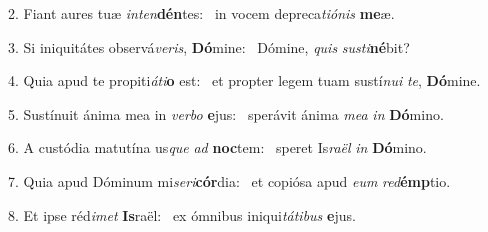 2. Fiant aures tuæ \textit{in}\textit{ten}\textbf{dén}tes: \ast\  in vocem depreca\textit{ti}\textit{ó}\textit{nis} \textbf{me}æ.\

3. Si iniquitátes observá\textit{ve}\textit{ris}, \textbf{Dó}mine: \ast\  Dómine, \textit{quis} \textit{sus}\textit{ti}\textbf{né}bit?\

4. Quia apud te propiti\textit{á}\textit{ti}\textbf{o} est: \ast\  et propter legem tuam sustí\textit{nu}\textit{i} \textit{te}, \textbf{Dó}mine.\

5. Sustínuit ánima mea in \textit{ver}\textit{bo} \textbf{e}jus: \ast\  sperávit ánima \textit{me}\textit{a} \textit{in} \textbf{Dó}mino.\

6. A custódia matutína us\textit{que} \textit{ad} \textbf{noc}tem: \ast\  speret Is\textit{ra}\textit{ël} \textit{in} \textbf{Dó}mino.\

7. Quia apud Dóminum mi\textit{se}\textit{ri}\textbf{cór}dia: \ast\  et copiósa apud \textit{e}\textit{um} \textit{red}\textbf{émp}tio.\

8. Et ipse réd\textit{i}\textit{met} \textbf{Is}raël: \ast\  ex ómnibus iniqui\textit{tá}\textit{ti}\textit{bus} \textbf{e}jus.\

